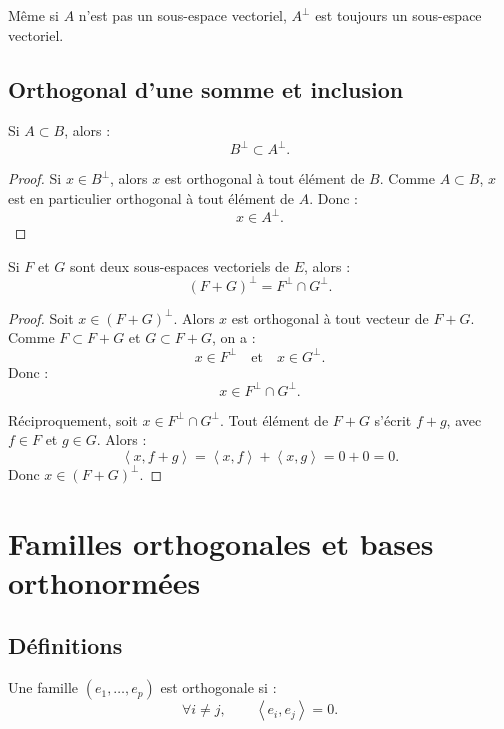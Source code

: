 \documentclass[11pt,a4paper]{article}
\newcommand{\scal}[2]{\left\langle #1,#2\right\rangle}
\begin{document}
\begin{retenirbox}
Même si \(A\) n'est pas un sous-espace vectoriel, \(A^\perp\) est toujours un sous-espace vectoriel.
\end{retenirbox}

\subsection{Orthogonal d'une somme et inclusion}

\begin{theorembox}
Si \(A\subset B\), alors :
\[
B^\perp\subset A^\perp.
\]
\end{theorembox}

\begin{proof}
Si \(x\in B^\perp\), alors \(x\) est orthogonal à tout élément de \(B\).  
Comme \(A\subset B\), \(x\) est en particulier orthogonal à tout élément de \(A\).  
Donc :
\[
x\in A^\perp.
\]
\end{proof}

\begin{theorembox}
Si \(F\) et \(G\) sont deux sous-espaces vectoriels de \(E\), alors :
\[
(F+G)^\perp=F^\perp\cap G^\perp.
\]
\end{theorembox}

\begin{proof}
Soit \(x\in(F+G)^\perp\).  
Alors \(x\) est orthogonal à tout vecteur de \(F+G\).  
Comme \(F\subset F+G\) et \(G\subset F+G\), on a :
\[
x\in F^\perp
\quad\text{et}\quad
x\in G^\perp.
\]
Donc :
\[
x\in F^\perp\cap G^\perp.
\]

Réciproquement, soit \(x\in F^\perp\cap G^\perp\).  
Tout élément de \(F+G\) s'écrit \(f+g\), avec \(f\in F\) et \(g\in G\).  
Alors :
\[
\scal{x}{f+g}=\scal{x}{f}+\scal{x}{g}=0+0=0.
\]
Donc \(x\in(F+G)^\perp\).
\end{proof}

\section{Familles orthogonales et bases orthonormées}

\subsection{Définitions}

\begin{definitionbox}
Une famille \((e_1,\dots,e_p)\) est orthogonale si :
\[
\forall i\neq j,\qquad \scal{e_i}{e_j}=0.
\]
\end{definitionbox}
\end{document}
